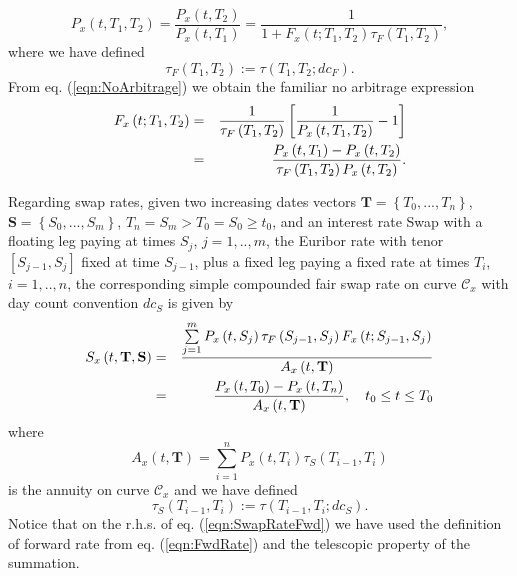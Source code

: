\documentclass[11pt,reqno]{amsart}
\begin{document}
\begin{equation}
P_x\left(t,T_1,T_2\right)
= \frac{P_x\left(t,T_2\right)}{P_x\left(t,T_1\right)}
= \frac{1}{1+F_x\left(t;T_1,T_2\right)\tau_F\left(T_1,T_2\right) },
\end{equation}
where we have defined
\begin{equation}
\tau_F\left(T_1,T_2\right) := \tau\left(T_1,T_2;dc_F\right).
\label{eqn:yfFRA}
\end{equation}
From eq. (\ref{eqn:NoArbitrage}) we obtain the familiar no arbitrage expression
\begin{eqnarray}
F_{x}\left(t;T_{1},T_{2}\right)
&=& \frac{1}{\tau_F\left(T_{1},T_{2}\right)}\left[\frac{1}{P_{x}\left(t,T_{1},T_{2}\right) }-1\right]   \notag \\
&=& \frac{P_{x}\left(t,T_{1}\right) - P_{x}\left(t,T_{2}\right)}{\tau_F\left(T_{1},T_{2}\right) P_{x}\left(t,T_{2}\right)}.
\label{eqn:FwdRate}
\end{eqnarray}
\par
Regarding swap rates, given two increasing dates vectors
$\mathbf{T=}\left\{T_0,...,T_n\right\}$,
$\mathbf{S=}\left\{S_0,...,S_m\right\}$, $T_n = S_m > T_0 = S_0 \geq t_0$, and an interest rate Swap with a floating leg paying at times $S_j$, $j=1,..,m$, the Euribor rate with tenor
$\left[S_{j-1},S_j\right]$ fixed at time $S_{j-1}$, plus a fixed leg paying a fixed rate at times $T_{i}$, $i=1,..,n$, the corresponding simple compounded fair swap rate on curve $\mathcal{C}_x$ with day count convention $dc_S$ is given by
\begin{eqnarray}
S_x\left(t,\mathbf{T},\mathbf{S}\right)
&=& \frac{\sum\limits_{j=1}^m P_x\left(t,S_j\right) \tau_F\left(S_{j-1},S_j\right) F_x\left(t;S_{j-1},S_j\right)}{A_x\left(t,\mathbf{T}\right)} \notag \\
&=& \frac{P_x\left(t,T_0\right) - P_x\left(t,T_n\right)}{A_x\left(t,\mathbf{T}\right)}
,\quad t_0\leq t\leq T_{0}
\label{eqn:SwapRateFwd}
\end{eqnarray}
where
\begin{equation}
A_x\left(t,\mathbf{T}\right)
= \sum\limits_{i=1}^{n}P_x\left(t,T_i\right) \tau_S\left(T_{i-1},T_i\right)
\label{eqn:Annuity}
\end{equation}
is the annuity on curve $\mathcal{C}_x$ and we have defined
\begin{equation}
\tau_S\left(T_{i-1},T_i\right)
:= \tau\left(T_{i-1},T_i;dc_S\right).
\end{equation}
Notice that on the r.h.s. of eq. (\ref{eqn:SwapRateFwd}) we have used the definition of forward rate from eq. (\ref{eqn:FwdRate}) and the telescopic property of the summation.
\end{document}
